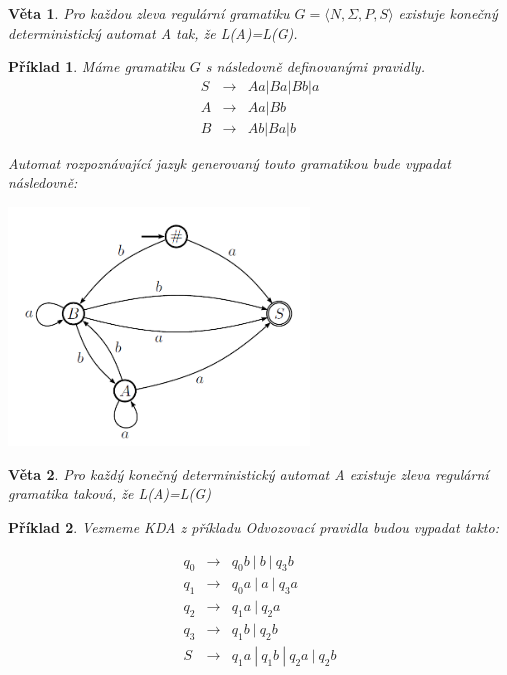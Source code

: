 \documentclass[10pt,a4paper]{article}
\theoremstyle{note}
\newtheorem{veta}{Věta}
\newtheorem{priklad}{Příklad}
\begin{document}
\begin{veta}
Pro každou zleva regulární gramatiku $ G = \langle N,\Sigma,P,S \rangle $ existuje konečný deterministický automat \textit{A} tak, že \textit{L(A)=L(G)}.
\end{veta}


\begin{priklad}
Máme gramatiku $G$ s následovně definovanými pravidly.
\begin{eqnarray*}
S &\rightarrow& Aa|Ba|Bb|a \\
A &\rightarrow& Aa|Bb \\
B &\rightarrow& Ab|Ba|b
\end{eqnarray*}

Automat rozpoznávající jazyk generovaný touto gramatikou bude vypadat následovně:

\begin{center}
\centering\includegraphics[width=8cm]{img/reg4.png}
\end{center}

\end{priklad}

\begin{veta}
Pro každý konečný deterministický automat \textit{A} existuje zleva regulární gramatika taková, že \textit{L(A)=L(G)}
\end{veta}


\begin{priklad}
Vezmeme KDA z příkladu 
Odvozovací pravidla budou vypadat takto:

\begin{eqnarray*}
q_0 &\rightarrow& q_{0}b\ |\ b\ |\ q_{3}b \\
q_1 &\rightarrow& q_{0}a\ |\ a\ |\ q_{3}a \\
q_2 &\rightarrow& q_{1}a\ |\ q_{2}a \\
q_3 &\rightarrow& q_{1}b\ |\ q_{2}b \\
S &\rightarrow& q_{1}a\ |\ q_{1}b\ |\ q_{2}a\ |\ q_{2}b \\
\end{eqnarray*}

\end{priklad}
\end{document}
